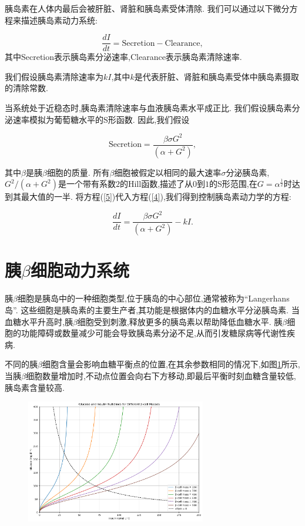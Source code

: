 胰岛素在人体内最后会被肝脏、肾脏和胰岛素受体清除. 我们可以通过以下微分方程来描述胰岛素动力系统:

\begin{equation}\label{4}
    \frac{dI}{dt} = \text{Secretion} - \text{Clearance},
\end{equation}
其中Secretion表示胰岛素分泌速率,Clearance表示胰岛素清除速率. 

我们假设胰岛素清除速率为\(kI\),其中$k$是代表肝脏、肾脏和胰岛素受体中胰岛素摄取的清除常数. 

当系统处于近稳态时,胰岛素清除速率与血液胰岛素水平成正比. 我们假设胰岛素分泌速率模拟为葡萄糖水平的S形函数\cite{topp2000model}. 因此,我们假设

\begin{equation}\label{5}
    \text{Secretion} = \frac{\beta\sigma G^2}{(\alpha + G^2)},
\end{equation}

其中$\beta$是胰$\beta$细胞的质量. 所有$\beta$细胞被假定以相同的最大速率$\sigma$分泌胰岛素,\(G^2/(\alpha + G^2)\)是一个带有系数$2$的Hill函数,描述了从$0$到$1$的S形范围,在$G=\alpha^{\frac{1}{2}}$时达到其最大值的一半. 将方程(\ref{5})代入方程(\ref{4}),我们得到控制胰岛素动力学的方程:

\begin{equation}
    \frac{dI}{dt} = \frac{\beta\sigma G^2}{(\alpha + G^2)} - kI.
\end{equation}

\section{胰\(\beta\)细胞动力系统}
胰$\beta$细胞是胰岛中的一种细胞类型,位于胰岛的中心部位,通常被称为“Langerhans岛”. 这些细胞是胰岛素的主要生产者,其功能是根据体内的血糖水平分泌胰岛素. 当血糖水平升高时,胰$\beta$细胞受到刺激,释放更多的胰岛素以帮助降低血糖水平. 胰$\beta$细胞的功能障碍或数量减少可能会导致胰岛素分泌不足,从而引发糖尿病等代谢性疾病. 

不同的胰$\beta$细胞含量会影响血糖平衡点的位置,在其余参数相同的情况下,如图\ref{fig:nullcline}所示,当胰$\beta$细胞数量增加时,不动点位置会向右下方移动,即最后平衡时刻血糖含量较低,胰岛素含量较高. 


\begin{figure}[H]
    \centering
    \includegraphics[width=0.7\textwidth]{Img/nullcline.png}
    \centering{}
    \label{fig:nullcline}
\end{figure}

